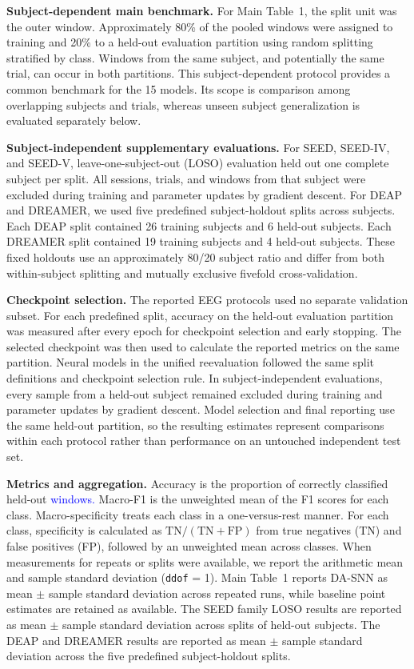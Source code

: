 \documentclass[12pt]{article}
\newcommand{\rev}[1]{\textcolor{blue}{#1}}
\begin{document}
\textbf{Subject-dependent main benchmark.}
For Main Table~1, the split unit was the outer window. Approximately 80\% of the pooled windows were assigned to training and 20\% to a held-out evaluation partition using random splitting stratified by class. Windows from the same subject, and potentially the same trial, can occur in both partitions. This subject-dependent protocol provides a common benchmark for the 15 models. Its scope is comparison among overlapping subjects and trials, whereas unseen subject generalization is evaluated separately below.

\textbf{Subject-independent supplementary evaluations.}
For SEED, SEED-IV, and SEED-V, leave-one-subject-out (LOSO) evaluation held out one complete subject per split. All sessions, trials, and windows from that subject were excluded during training and parameter updates by gradient descent. For DEAP and DREAMER, we used five predefined subject-holdout splits across subjects. Each DEAP split contained 26 training subjects and 6 held-out subjects. Each DREAMER split contained 19 training subjects and 4 held-out subjects. These fixed holdouts use an approximately 80/20 subject ratio and differ from both within-subject splitting and mutually exclusive fivefold cross-validation.

\textbf{Checkpoint selection.}
The reported EEG protocols used no separate validation subset. For each predefined split, accuracy on the held-out evaluation partition was measured after every epoch for checkpoint selection and early stopping. The selected checkpoint was then used to calculate the reported metrics on the same partition. Neural models in the unified reevaluation followed the same split definitions and checkpoint selection rule. In subject-independent evaluations, every sample from a held-out subject remained excluded during training and parameter updates by gradient descent. Model selection and final reporting use the same held-out partition, so the resulting estimates represent comparisons within each protocol rather than performance on an untouched independent test set.

\textbf{Metrics and aggregation.}
Accuracy is the proportion of correctly classified held-out \rev{windows.} Macro-F1 is the unweighted mean of the F1 scores for each class. Macro-specificity treats each class in a one-versus-rest manner. For each class, specificity is calculated as $\mathrm{TN}/(\mathrm{TN}+\mathrm{FP})$ from true negatives (TN) and false positives (FP), followed by an unweighted mean across classes. When measurements for repeats or splits were available, we report the arithmetic mean and sample standard deviation (\texttt{ddof} = 1). Main Table~1 reports DA-SNN as mean $\pm$ sample standard deviation across repeated runs, while baseline point estimates are retained as available. The SEED family LOSO results are reported as mean $\pm$ sample standard deviation across splits of held-out subjects. The DEAP and DREAMER results are reported as mean $\pm$ sample standard deviation across the five predefined subject-holdout splits.
\end{document}
